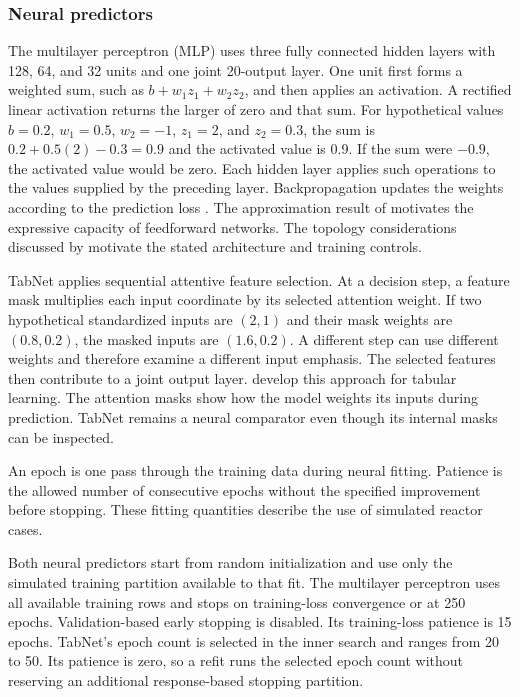 \subsubsection{Neural predictors}

The multilayer perceptron (MLP) uses three fully connected hidden layers with 128, 64, and 32 units and one joint 20-output layer. One unit first forms a weighted sum, such as $b+w_1z_1+w_2z_2$, and then applies an activation. A rectified linear activation returns the larger of zero and that sum. For hypothetical values $b=0.2$, $w_1=0.5$, $w_2=-1$, $z_1=2$, and $z_2=0.3$, the sum is $0.2+0.5(2)-0.3=0.9$ and the activated value is 0.9. If the sum were $-0.9$, the activated value would be zero. Each hidden layer applies such operations to the values supplied by the preceding layer. Backpropagation updates the weights according to the prediction loss \citep{Rumelhart1986}. The approximation result of \citet{Hornik1989} motivates the expressive capacity of feedforward networks. The topology considerations discussed by \citet{Curteanu2011} motivate the stated architecture and training controls.

TabNet applies sequential attentive feature selection. At a decision step, a feature mask multiplies each input coordinate by its selected attention weight. If two hypothetical standardized inputs are $(2,1)$ and their mask weights are $(0.8,0.2)$, the masked inputs are $(1.6,0.2)$. A different step can use different weights and therefore examine a different input emphasis. The selected features then contribute to a joint output layer. \citet{ArikPfister2021} develop this approach for tabular learning. The attention masks show how the model weights its inputs during prediction. TabNet remains a neural comparator even though its internal masks can be inspected.

An epoch is one pass through the training data during neural fitting. Patience is the allowed number of consecutive epochs without the specified improvement before stopping. These fitting quantities describe the use of simulated reactor cases.

Both neural predictors start from random initialization and use only the simulated training partition available to that fit. The multilayer perceptron uses all available training rows and stops on training-loss convergence or at 250 epochs. Validation-based early stopping is disabled. Its training-loss patience is 15 epochs. TabNet's epoch count is selected in the inner search and ranges from 20 to 50. Its patience is zero, so a refit runs the selected epoch count without reserving an additional response-based stopping partition.

